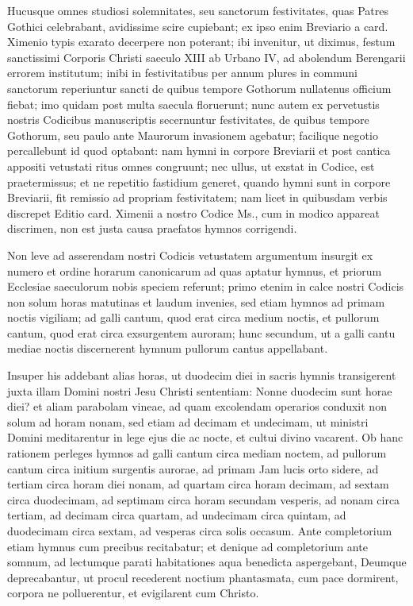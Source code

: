 \documentclass[letter,11pt]{book}
\begin{document}
Hucusque omnes studiosi solemnitates, seu sanctorum festivitates, quas Patres Gothici celebrabant, avidissime scire cupiebant; ex ipso enim Breviario a card. Ximenio typis exarato decerpere non poterant; ibi invenitur, ut diximus, festum sanctissimi Corporis Christi saeculo XIII ab Urbano IV, ad abolendum Berengarii errorem institutum; inibi in festivitatibus per annum plures in communi sanctorum reperiuntur sancti de quibus tempore Gothorum nullatenus officium fiebat; imo quidam post multa saecula floruerunt; nunc autem ex pervetustis nostris Codicibus manuscriptis secernuntur festivitates, de quibus tempore Gothorum, seu paulo ante Maurorum invasionem agebatur; facilique negotio percallebunt id quod optabant: nam hymni in corpore Breviarii et post cantica appositi vetustati ritus omnes congruunt; nec ullus, ut exstat in Codice, est praetermissus; et ne repetitio fastidium generet, quando hymni sunt in corpore Breviarii, fit remissio ad propriam festivitatem; nam licet in quibusdam verbis discrepet Editio card. Ximenii a nostro Codice Ms., cum in modico appareat discrimen, non est justa causa praefatos hymnos corrigendi.

Non leve ad asserendam nostri Codicis vetustatem argumentum insurgit ex numero et ordine horarum canonicarum ad quas aptatur hymnus, et priorum Ecclesiae saeculorum nobis speciem referunt; primo etenim in calce nostri Codicis non solum horas matutinas et laudum invenies, sed etiam hymnos ad primam noctis vigiliam; ad galli cantum, quod erat circa medium noctis, et pullorum cantum, quod erat circa exsurgentem auroram; hunc secundum, ut a galli cantu mediae noctis discernerent hymnum pullorum cantus appellabant.

Insuper his addebant alias horas, ut duodecim diei in sacris hymnis transigerent juxta illam Domini nostri Jesu Christi sententiam: Nonne duodecim sunt horae diei? et aliam parabolam vineae, ad quam excolendam operarios conduxit non solum ad horam nonam, sed etiam ad decimam et undecimam, ut ministri Domini meditarentur in lege ejus die ac nocte, et cultui divino vacarent. Ob hanc rationem perleges hymnos ad galli cantum circa mediam noctem, ad pullorum cantum circa initium surgentis aurorae, ad primam Jam lucis orto sidere, ad tertiam circa horam diei nonam, ad quartam circa horam decimam, ad sextam circa duodecimam, ad septimam circa horam secundam vesperis, ad nonam circa tertiam, ad decimam circa quartam, ad undecimam circa quintam, ad duodecimam circa sextam, ad vesperas circa solis occasum. Ante completorium etiam hymnus cum precibus recitabatur; et denique ad completorium ante somnum, ad lectumque parati habitationes aqua benedicta aspergebant, Deumque deprecabantur, ut procul recederent noctium phantasmata, cum pace dormirent, corpora ne polluerentur, et evigilarent cum Christo.
\end{document}
